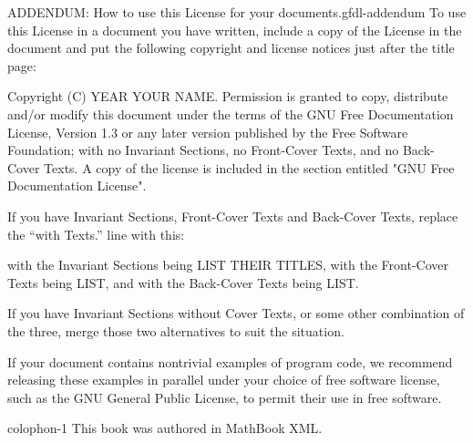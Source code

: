 \documentclass[10pt,]{book}
\numberwithin{equation}{section}
\begin{document}
\begin{paragraphs}{ADDENDUM: How to use this License for your documents.}{gfdl-addendum}%
\hypertarget{p-1586}{}%
To use this License in a document you have written, include a copy of the License in the document and put the following copyright and license notices just after the title page:%
\begin{preformatted}
Copyright (C)  YEAR  YOUR NAME.
Permission is granted to copy, distribute and/or modify this document
under the terms of the GNU Free Documentation License, Version 1.3
or any later version published by the Free Software Foundation;
with no Invariant Sections, no Front-Cover Texts, and no Back-Cover Texts.
A copy of the license is included in the section entitled "GNU
Free Documentation License".
\end{preformatted}
\hypertarget{p-1587}{}%
If you have Invariant Sections, Front-Cover Texts and Back-Cover Texts, replace the ``with\textellipsis{} Texts.'' line with this:%
\begin{preformatted}
with the Invariant Sections being LIST THEIR TITLES, with the
Front-Cover Texts being LIST, and with the Back-Cover Texts being LIST.
\end{preformatted}
\hypertarget{p-1588}{}%
If you have Invariant Sections without Cover Texts, or some other combination of the three, merge those two alternatives to suit the situation.%
\par
\hypertarget{p-1589}{}%
If your document contains nontrivial examples of program code, we recommend releasing these examples in parallel under your choice of free software license, such as the GNU General Public License, to permit their use in free software.%
\end{paragraphs}%
%
\backmatter
%
%
\printindex
%
\cleardoublepage
\pagestyle{empty}
\begin{backcolophon}{colophon-1}%
\hypertarget{p-1590}{}%
This book was authored in MathBook XML.%
\end{backcolophon}%
\end{document}
